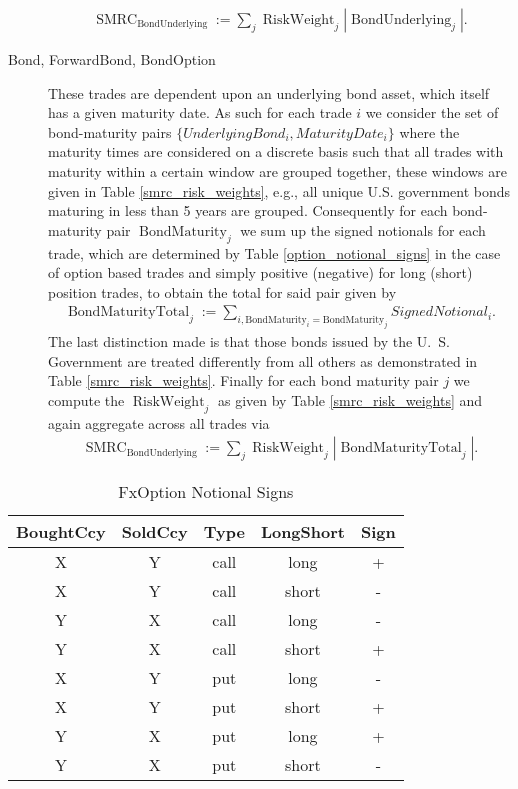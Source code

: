 \begin{description}
\begin{align*}
		\operatorname{SMRC}_{\text{BondUnderlying}} := \sum_{j}{\operatorname{RiskWeight}_j |\operatorname{BondUnderlying}_j| }.
	\end{align*}
	\item[Bond, ForwardBond, BondOption] These trades are dependent upon an underlying bond asset, which itself has a given maturity date. As such for each trade $i$ we consider the set of bond-maturity pairs $\{UnderlyingBond_i, MaturityDate_i\}$ where the maturity times are considered on a discrete basis such that all trades with maturity within a certain window are grouped together, these windows are given in Table \ref{smrc_risk_weights}, e.g., all unique U.S. government bonds maturing in less than 5 years are grouped. Consequently for each bond-maturity pair $\operatorname{BondMaturity}_j$ we sum up the signed notionals for each trade, which are determined by Table \ref{option_notional_signs} in the case of option based trades and simply positive (negative) for long (short) position trades, to obtain the total for said pair given by
	\begin{align*}
		\operatorname{BondMaturityTotal}_{j} := \sum_{i, \text{BondMaturity}_i = \text{BondMaturity}_j} SignedNotional_i.
	\end{align*}
	The last distinction made is that those bonds issued by the U.~S. Government are treated differently from all others as demonstrated in Table \ref{smrc_risk_weights}. Finally for each bond maturity pair $j$ we compute the $\operatorname{RiskWeight}_j$ as given by Table \ref{smrc_risk_weights} and again aggregate across all trades via
	\begin{align*}
		\operatorname{SMRC}_{\text{BondUnderlying}} := \sum_{j}{\operatorname{RiskWeight}_j |\operatorname{BondMaturityTotal}_j|}.
	\end{align*}
\end{description}

\begin{table}[htpb]
	\begin{tabular}{|c | c | c| c| c|}
		\hline
		BoughtCcy & SoldCcy & Type & LongShort & Sign \\ \hline
		X & Y & call & long & + \\
		X & Y & call & short & - \\
		Y & X & call & long & - \\
		Y & X & call & short & + \\ \hline
		X & Y & put & long & - \\
		X & Y & put & short & + \\
		Y & X & put & long & + \\
		Y & X & put & short & - \\
		\hline
	\end{tabular}
	\caption{FxOption Notional Signs}
	\label{fx_option_notional_signs}
\end{table}



